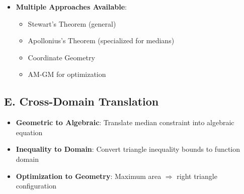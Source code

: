 \documentclass[12pt]{article}
\begin{document}
\begin{strategicbox}
\begin{itemize}[leftmargin=*]
    \item \textbf{Multiple Approaches Available}:
    \begin{itemize}
        \item Stewart's Theorem (general)
        \item Apollonius's Theorem (specialized for medians)
        \item Coordinate Geometry
        \item AM-GM for optimization
    \end{itemize}
\end{itemize}

\subsection*{E. Cross-Domain Translation}
\begin{itemize}[leftmargin=*]
    \item \textbf{Geometric to Algebraic}: Translate median constraint into algebraic equation
    
    \item \textbf{Inequality to Domain}: Convert triangle inequality bounds to function domain
    
    \item \textbf{Optimization to Geometry}: Maximum area $\Rightarrow$ right triangle configuration
\end{itemize}
\end{strategicbox}
\end{document}
